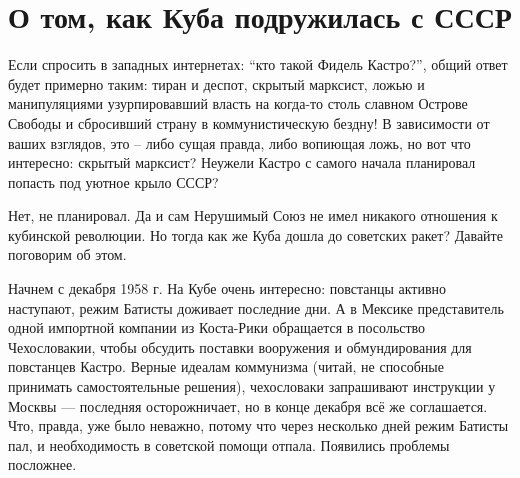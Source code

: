  \chapter{О том, как Куба подружилась с СССР }


Если спросить в западных интернетах: “кто такой Фидель Кастро?”, общий ответ будет примерно таким: тиран и деспот, скрытый марксист, ложью и манипуляциями узурпировавший власть на когда-то столь славном Острове Свободы и сбросивший страну в коммунистическую бездну! В зависимости от ваших взглядов, это – либо сущая правда, либо вопиющая ложь, но вот что интересно: скрытый марксист? Неужели Кастро с самого начала планировал попасть под уютное крыло СССР?

Нет, не планировал. Да и сам Нерушимый Союз не имел никакого отношения к кубинской революции. Но тогда как же Куба дошла до советских ракет? Давайте поговорим об этом.

Начнем с декабря 1958 г. На Кубе очень интересно: повстанцы активно наступают, режим Батисты доживает последние дни. А в Мексике представитель одной импортной компании из Коста-Рики обращается в посольство Чехословакии, чтобы обсудить поставки вооружения и обмундирования для повстанцев Кастро. Верные идеалам коммунизма (читай, не способные принимать самостоятельные решения), чехословаки запрашивают инструкции у Москвы — последняя осторожничает, но в конце декабря всё же соглашается. Что, правда, уже было неважно, потому что через несколько дней режим Батисты пал, и необходимость в советской помощи отпала. Появились проблемы посложнее.


